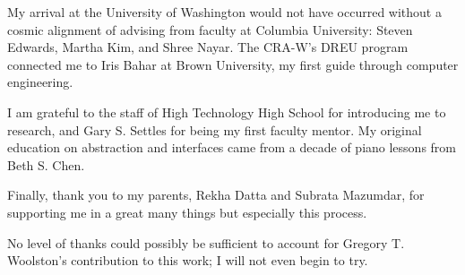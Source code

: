 My arrival at the University of Washington would not have occurred without a cosmic alignment of advising from faculty at Columbia University: Steven Edwards, Martha Kim, and Shree Nayar. The CRA-W's DREU program connected me to Iris Bahar at Brown University, my first guide through computer engineering.

I am grateful to the staff of High Technology High School for introducing me to research, and Gary S. Settles for being my first faculty mentor. My original education on abstraction and interfaces came from a decade of piano lessons from Beth S. Chen.

Finally, thank you to my parents, Rekha Datta and Subrata Mazumdar, for supporting me in a great many things but especially this process.

No level of thanks could possibly be sufficient to account for Gregory T. Woolston's contribution to this work; I will not even begin to try.

\endgroup
